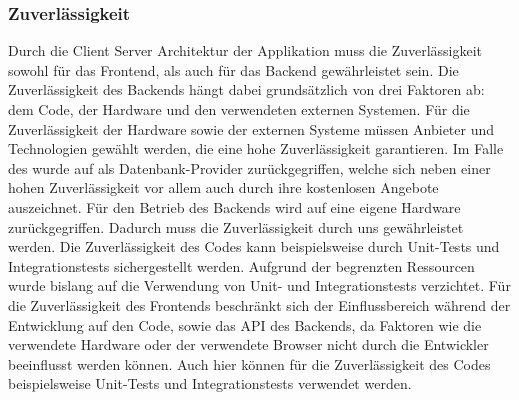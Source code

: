 \subsubsection{Zuverlässigkeit}
Durch die Client Server Architektur der Applikation muss die Zuverlässigkeit sowohl für das Frontend, als auch für das Backend gewährleistet sein.
Die Zuverlässigkeit des Backends hängt dabei grundsätzlich von drei Faktoren ab: dem Code, der Hardware und den verwendeten externen Systemen.
Für die Zuverlässigkeit der Hardware sowie der externen Systeme müssen Anbieter und Technologien gewählt werden, die eine hohe Zuverlässigkeit garantieren.
Im Falle des  wurde auf  als Datenbank-Provider zurückgegriffen, welche sich neben einer hohen Zuverlässigkeit vor allem auch durch ihre kostenlosen Angebote auszeichnet.
Für den Betrieb des Backends wird auf eine eigene Hardware zurückgegriffen.
Dadurch muss die Zuverlässigkeit durch uns gewährleistet werden.
Die Zuverlässigkeit des Codes kann beispielsweise durch Unit-Tests und Integrationstests sichergestellt werden.
Aufgrund der begrenzten Ressourcen wurde bislang auf die Verwendung von Unit- und Integrationstests verzichtet.
\newparagraph
Für die Zuverlässigkeit des Frontends beschränkt sich der Einflussbereich während der Entwicklung auf den Code, sowie das \ac{API} des Backends, da Faktoren wie die verwendete Hardware oder der verwendete Browser nicht durch die Entwickler beeinflusst werden können.
Auch hier können für die Zuverlässigkeit des Codes beispielsweise Unit-Tests und Integrationstests verwendet werden.

